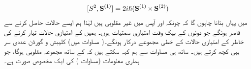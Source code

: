 \begin{align}\label{مساوات_تین_ابعادی_مربع_ایک_مقلوب}
[S^2 , \operatorname{\mathbf{S}}^{(1)}] = 2 i \hslash (\operatorname{\mathbf{S}}^{(1)} \times \operatorname{\mathbf{S}}^{(2)})
\end{align}
 میں یہاں بتانا چاہوں گا کہ چونکہ  اور  آپس میں غیر مقلوبی ہیں لہٰذا ہم ایسے حالات حاصل کرنے سے قاصر ہونگے جو دونوں کے بیک وقت امتیازی سمتیات ہوں۔ ہمیں  کے امتیازی حالات تیار کرنے کی خاطر  کے امتیازی حالات کے خطی مجموعے درکار ہونگے۔( مساوات  میں) کلیبش و گورڈن عددی سر یہی کچھ کرتے ہیں۔ ساتھ ہی مساوات  سے ہم کہہ سکتے ہیں کہ  کے ساتھ
 مجموعہ  مقلوبی ہوگا، جو ہماری معلومات (مساوات ) کی ایک مخصوص صورت ہے۔


